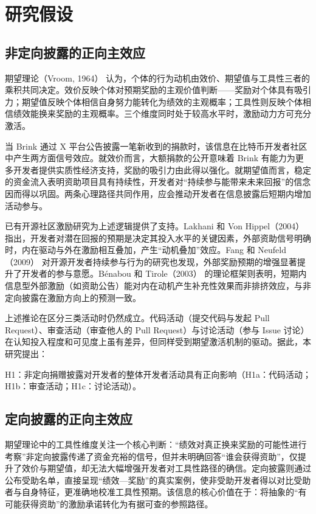 \section{研究假设}
\label{sec:hypotheses-1}

\subsection{非定向披露的正向主效应}

期望理论（Vroom, 1964）\cite{vroom1964work} 认为，个体的行为动机由效价、期望值与工具性三者的乘积共同决定。效价反映个体对预期奖励的主观价值判断——奖励对个体具有吸引力；期望值反映个体相信自身努力能转化为绩效的主观概率；工具性则反映个体相信绩效能换来奖励的主观概率。三个维度同时处于较高水平时，激励动力方可充分激活。

当 Brink 通过 X 平台公告披露一笔新收到的捐款时，该信息在比特币开发者社区中产生两方面信号效应。就效价而言，大额捐款的公开意味着 Brink 有能力为更多开发者提供实质性经济支持，奖励的吸引力由此得以强化。就期望值而言，稳定的资金流入表明资助项目具有持续性，开发者对“持续参与能带来未来回报”的信念因而得以巩固。两条心理路径共同作用，应会推动开发者在信息披露后短期内增加活动参与。

已有开源社区激励研究为上述逻辑提供了支持。Lakhani 和 Von Hippel（2004）\cite{lakhani2003open} 指出，开发者对潜在回报的预期是决定其投入水平的关键因素，外部资助信号明确时，内在驱动与外在激励相互叠加，产生“动机叠加”效应。Fang 和 Neufeld（2009）\cite{fang2009understanding} 对开源开发者持续参与行为的研究也发现，外部奖励预期的增强显著提升了开发者的参与意愿。B\'{e}nabou 和 Tirole（2003）\cite{benabou2003intrinsic} 的理论框架则表明，短期内信息型外部激励（如资助公告）能对内在动机产生补充性效果而非排挤效应，与非定向披露在激励方向上的预测一致。

上述推论在区分三类活动时仍然成立。代码活动（提交代码与发起 Pull Request）、审查活动（审查他人的 Pull Request）与讨论活动（参与 Issue 讨论）在认知投入程度和可见度上虽有差异，但同样受到期望激活机制的驱动。据此，本研究提出：

H1：非定向捐赠披露对开发者的整体开发者活动具有正向影响（H1a：代码活动；H1b：审查活动；H1c：讨论活动）。

\subsection{定向披露的正向主效应}

期望理论中的工具性维度关注一个核心判断：“绩效对真正换来奖励的可能性进行考察”非定向披露传递了资金充裕的信号，但并未明确回答“谁会获得资助”，仅提升了效价与期望值，却无法大幅增强开发者对工具性路径的确信。定向披露则通过公布受助名单，直接呈现“绩效—奖励”的真实案例，使非受助开发者得以对比受助者与自身特征，更准确地校准工具性预期。该信息的核心价值在于：将抽象的“有可能获得资助”的激励承诺转化为有据可查的参照路径。

